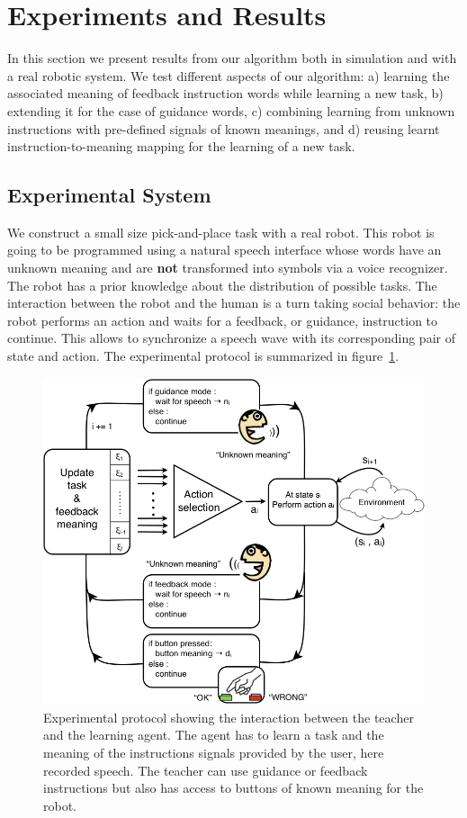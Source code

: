 \newcommand{\ww}{0.64}
%
\section{Experiments and Results}
\label{sec:First}
%
 In this section we present results from our algorithm both in simulation and with a real robotic system. We test different aspects of our algorithm: a) learning the associated meaning of feedback instruction words while learning a new task, b) extending it for the case of guidance words, c) combining learning from unknown instructions with pre-defined signals of known meanings, and d) reusing learnt instruction-to-meaning mapping for the learning of a new task.
%
\subsection{Experimental System}
\label{sec:ExperimentalSetup}
%
We construct a small size pick-and-place task with a real robot. This robot is going to be programmed using a natural speech interface whose words have an unknown meaning and are \textbf{not} transformed into symbols via a voice recognizer. The robot has a prior knowledge about the distribution of possible tasks.%
The interaction between the robot and the human is a turn taking social behavior: the robot performs an action and waits for a feedback, or guidance, instruction to continue. This allows to synchronize a speech wave with its corresponding pair of state and action. The experimental protocol is summarized in figure~\ref{bloc}.
%
\begin{figure}[!htbp]
	\centering
		\includegraphics[width=\columnwidth]{images/bloc4.png}
	\caption{Experimental protocol showing the interaction between the teacher and the learning agent. The agent has to learn a task and the meaning of the instructions signals provided by the user, here recorded speech. The teacher can use guidance or feedback instructions but also has access to buttons of known meaning for the robot.}
	\label{bloc}	
\end{figure}
%
